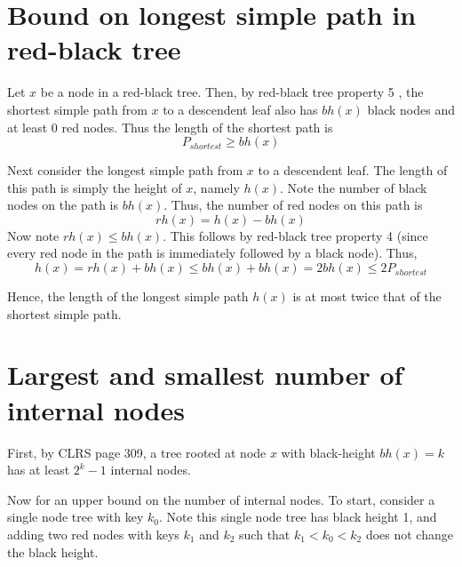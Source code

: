 \documentclass[paper=a4, fontsize=11pt]{scrartcl} %
\numberwithin{equation}{section} %
\numberwithin{figure}{section} %
\numberwithin{table}{section} %
\begin{document}
\section{Bound on longest simple path in red-black tree}

Let $x$ be a node in a red-black tree. Then, by red-black tree property 5 , the shortest simple path from $x$ to a descendent leaf also has $bh(x)$ black nodes and at least $0$ red nodes. Thus the length of the shortest path is
\[P_{shortest} \geq bh(x)\]

Next consider the longest simple path from $x$ to a descendent leaf. The length of this path is simply the height of $x$, namely $h(x)$. Note the number of black nodes on the path is $bh(x)$. Thus, the number of red nodes on this path is
\[rh(x) = h(x) - bh(x)\]
Now note $rh(x) \leq bh(x)$. This follows by red-black tree property 4 (since every red node in the path is immediately followed by a black node). Thus,
\[h(x) = rh(x) + bh(x) \leq bh(x) + bh(x) = 2 bh(x) \leq 2 P_{shortest}\]

Hence, the length of the longest simple path $h(x)$ is at most twice that of the shortest simple path.

\section{Largest and smallest number of internal nodes}

First, by CLRS page 309, a tree rooted at node $x$ with black-height $bh(x) = k$ has at least $2^k - 1$ internal nodes.

Now for an upper bound on the number of internal nodes. To start, consider a single node tree with key $k_0$.  Note this single node tree has black height 1, and adding two red nodes with keys $k_1$ and $k_2$ such that $k_1 < k_0 < k_2$ does not change the black height. 

\begin{center}
\end{center}
\end{document}
